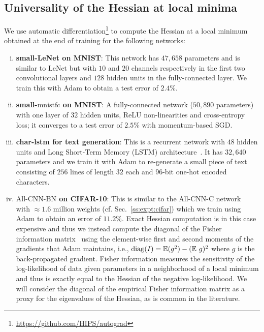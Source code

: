 \documentclass[10pt]{article}
\newcommand{\mnistfc}{\textrm{mnistfc}}
\newcommand{\lenet}{\textrm{LeNet}}
\newcommand{\allcnn}{\textrm{All-CNN-BN}}
\begin{document}
\subsection{Universality of the Hessian at local minima}
\label{ss:expt:universality}

We use automatic differentiation\footnote{\href{https://github.com/HIPS/autograd}{https://github.com/HIPS/autograd}} to compute the Hessian at a local minimum obtained at the end of training for the following networks:

\begin{enumerate}[(i)]
\item \textbf{small-LeNet on MNIST}: This network has $47,658$ parameters and is similar to $\lenet$ but with $10$ and $20$ channels respectively in the first two convolutional layers and $128$ hidden units in the fully-connected layer. We train this with Adam to obtain a test error of $2.4\%$.
%
\item \textbf{small-$\mnistfc$ on MNIST}: A fully-connected network ($50,890$ parameters) with one layer of $32$ hidden units, ReLU non-linearities and cross-entropy loss; it converges to a test error of $2.5\%$ with momentum-based SGD.
%
\item \textbf{char-lstm for text generation}: This is a recurrent network with $48$ hidden units and Long Short-Term Memory (LSTM) architecture~\citep{hochreiter1997long}. It has $32,640$ parameters and we train it with Adam to re-generate a small piece of text consisting of $256$ lines of length $32$ each and $96$-bit one-hot encoded characters.
%
\item \textbf{$\allcnn$ on CIFAR-10}: This is similar to the All-CNN-C network~\citep{springenberg2014striving} with $\approx 1.6$ million weights (cf. Sec.~\ref{ss:expt:cifar}) which we train using Adam to obtain an error of $11.2\%$. Exact Hessian computation is in this case expensive and thus we instead compute the diagonal of the Fisher information matrix~\citep{wasserman2013all} using the element-wise first and second moments of the gradients that Adam maintains, i.e., $\mathrm{diag} (I) = \mathbb{E}(g^2) - (\mathbb{E}\ g)^2$ where $g$ is the back-propagated gradient. Fisher information measures the sensitivity of the log-likelihood of data given parameters in a neighborhood of a local minimum and thus is exactly equal to the Hessian of the negative log-likelihood. We will consider the diagonal of the empirical Fisher information matrix as a proxy for the eigenvalues of the Hessian, as is common in the literature.
\end{enumerate}
\end{document}
